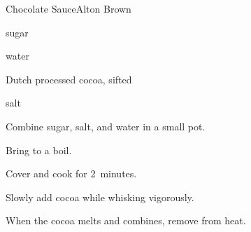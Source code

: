 \begin{recipe}{Chocolate Sauce}{Alton Brown}{\C{1\half}}

\begin{ingredients}
\item {} sugar
\item \C{\half} water
\item \C{\half} Dutch processed cocoa, sifted
\item \tp{\eighth} salt
\end{ingredients}

\begin{directions}
\item Combine sugar, salt, and water in a small pot.
\item Bring to a boil.
\item Cover and cook for 2~minutes.
\item Slowly add cocoa while whisking vigorously.
\item When the cocoa melts and combines, remove from heat.
 \end{directions}

\end{recipe}

